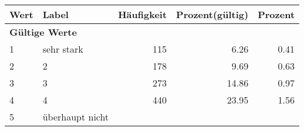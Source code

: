      \begin{longtable}{lXrrr}
     \toprule
     \textbf{Wert} & \textbf{Label} & \textbf{Häufigkeit} & \textbf{Prozent(gültig)} & \textbf{Prozent} \\
     \endhead
     \midrule
     \multicolumn{5}{l}{\textbf{Gültige Werte}}\\

     1 &
     \multicolumn{1}{X}{ sehr stark   } &


       \num{115} &
       \num[round-mode=places,round-precision=2]{6.26} &
         \num[round-mode=places,round-precision=2]{0.41} \\

     2 &
     \multicolumn{1}{X}{ 2   } &


       \num{178} &
       \num[round-mode=places,round-precision=2]{9.69} &
         \num[round-mode=places,round-precision=2]{0.63} \\

     3 &
     \multicolumn{1}{X}{ 3   } &


       \num{273} &
       \num[round-mode=places,round-precision=2]{14.86} &
         \num[round-mode=places,round-precision=2]{0.97} \\

     4 &
     \multicolumn{1}{X}{ 4   } &


       \num{440} &
       \num[round-mode=places,round-precision=2]{23.95} &
         \num[round-mode=places,round-precision=2]{1.56} \\

     5 &
     \multicolumn{1}{X}{ überhaupt nicht   } &



\end{longtable}
